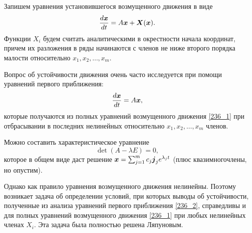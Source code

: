 Запишем уравнения установившегося возмущенного движения в виде
\begin{equation}
	\frac{d \mbox{\boldmath $x$}}{d t} = A \mbox{\boldmath $x$} + \mbox{\boldmath $X$}(\mbox{\boldmath $x$}).
	\label{236_1}
\end{equation}
Функции $X_i$ будем считать аналитическими в окрестности начала координат, причем их разложения в ряды начинаются с членов не ниже второго порядка малости относительно $x_1, x_2, \ldots, x_m$.

Вопрос об устойчивости движения очень часто исследуется при помощи уравнений первого приближения:
\begin{equation}
	\frac{d \mbox{\boldmath $x$}}{d t} = A \mbox{\boldmath $x$},
	\label{236_2}
\end{equation}
которые получаются из полных уравнений возмущенного движения \eqref{236_1} при отбрасывании в последних нелинейных относительно $x_1, x_2, \ldots, x_m$ членов.

Можно составить характеристическое уравнение
\begin{equation}
	\det(A - \lambda E) = 0,
	\label{236_3}
\end{equation}
которое в общем виде даст решение $\mbox{\boldmath $x$} = \sum_{j=1}^m c_j \mbox{\boldmath $j$}_j e^{\lambda_j t}$ (плюс квазимногочлены, но опустим).


Однако как правило уравнения возмущенного движения нелинейны. Поэтому возникает задача об определении условий, при которых выводы об устойчивости, полученные из анализа уравнений первого приближения \eqref{236_2}, справедливы и для полных уравнений возмущенного движения \eqref{236_1} при любых нелинейных членах $X_i$. Эта задача была полностью решена Ляпуновым.